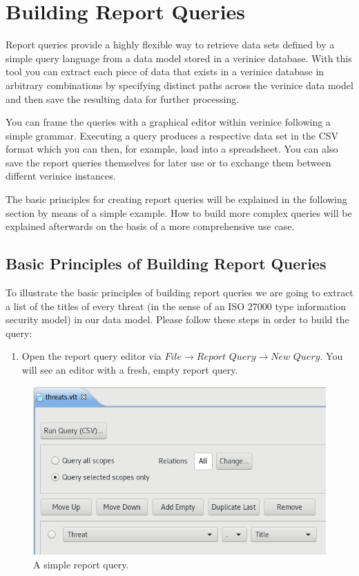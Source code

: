 \documentclass[a4paper,10pt]{book}
\providecommand{\tightlist}{%
  \setlength{\itemsep}{0pt}\setlength{\parskip}{0pt}}
\begin{document}
\section{Building Report Queries}\label{building-report-queries}

Report queries provide a highly flexible way to retrieve data sets defined by a
simple query language from a data model stored in a verinice database. With this
tool you can extract each piece of data that exists in a verinice database in
arbitrary combinations by specifying distinct paths across the verinice data
model and then save the resulting data for further processing.

You can frame the queries with a graphical editor within verinice following a
simple grammar. Executing a query produces a respective data set in the CSV
format which you can then, for example, load into a spreadsheet. You can also
save the report queries themselves for later use or to exchange them between
differnt verinice instances.

The basic principles for creating report queries will be explained in the
following section by means of a simple example. How to build more complex
queries will be explained afterwards on the basis of a more comprehensive use
case.

\subsection{Basic Principles of Building Report
Queries}\label{basic-principles-of-building-report-queries}

To illustrate the basic principles of building report queries we are going to
extract a list of the titles of every threat (in the sense of an ISO 27000 type
information security model) in our data model. Please follow these steps in
order to build the query:

\begin{enumerate}
\def\labelenumi{\arabic{enumi}.}
\tightlist
\item
  Open the report query editor via $\textit{File}\to\textit{Report
  Query}\to\textit{New Query}$. You will see an editor with a fresh, empty
  report query.
\end{enumerate}

\begin{figure}[htb!]
  \centering
  \includegraphics[width=\linewidth]{Screenshot/query-editor-simple-en.png}
  \caption{A simple report query.}
  \label{fig:simple-report-query}
\end{figure}
\end{document}
